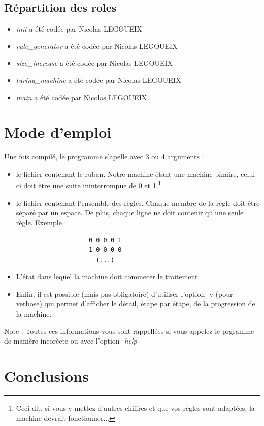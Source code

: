 \documentclass[12pt,a4paper]{report}
\begin{document}
\section{Répartition des roles}
\begin{itemize}
\item \textit{init} a été codée par Nicolas LEGOUEIX
\item \textit{rule\_generator} a été codée par Nicolas LEGOUEIX
\item \textit{size\_increase} a été codée par Nicolas LEGOUEIX
\item \textit{turing\_machine} a été codée par Nicolas LEGOUEIX
\item \textit{main} a été codée par Nicolas LEGOUEIX
\end{itemize}
\chapter{Mode d'emploi}
Une fois compilé, le programme s'apelle avec 3 ou 4 arguments :
\begin{itemize}
\item le fichier contenant le ruban. Notre machine étant une machine binaire, celui-ci doit être une suite ininterrompue de 0 et 1.\footnote{Ceci dit, si vous y mettez d'autres chiffres et que vos règles sont adaptées, la machine devrait fonctionner...}
\item le fichier contenant l'ensemble des règles. Chaque membre de la règle doit être séparé par un espace. De plus, chaque ligne ne doit contenir qu'une seule règle.
\underline{Exemple :}
\begin{center}
\begin{verbatim}
                    0 0 0 0 1
                    1 0 0 0 0
                      (...)
\end{verbatim}
\end{center}
\item L'état dans lequel la machine doit commecer le traitement.
\label{chap:emploi}
\item Enfin, il est possible (mais pas obligatoire) d'utiliser l'option -v (pour verbose) qui permet d'afficher le détail, étape par étape, de la progression de la machine.
\end{itemize}
Note : Toutes ces informations vous sont rappellées si vous appelez le prgramme de manière incorècte ou avec l'option \textit{-help}
\chapter{Conclusions}
\end{document}
